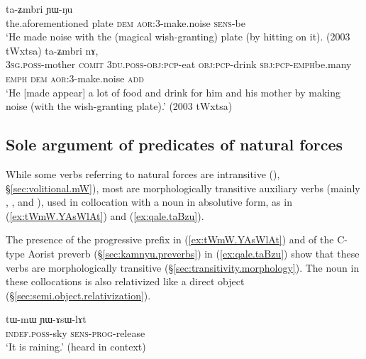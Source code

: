 \begin{exe}
\ex 
\begin{xlist}
\ex \label{ex:taZmbri}
  ta-ʑmbri ɲɯ-ŋu \\
 the.aforementioned plate \textsc{dem} \textsc{aor}:3\flobv{}-make.noise \textsc{sens}-be \\
\glt `He made noise with the (magical wish-granting) plate (by hitting on it). (2003 tWxtsa)
\ex \label{ex:taZmbri2}
  ta-ʑmbri nɤ, \\
 \textsc{3sg}.\textsc{poss}-mother \textsc{comit} \textsc{3du}.\textsc{poss}-\textsc{obj}:\textsc{pcp}-eat \textsc{obj}:\textsc{pcp}-drink \textsc{sbj}:\textsc{pcp}-\textsc{emph}\redp{}be.many \textsc{emph} \textsc{dem} \textsc{aor}:3\flobv{}-make.noise \textsc{add} \\
\glt `He [made appear] a lot of food and drink for him and his mother by making noise (with the wish-granting plate).' (2003 tWxtsa)
\end{xlist}
\end{exe}

\subsection{Sole argument of predicates of natural forces} \label{sec:absolutive.nature}
  
While some verbs referring to natural forces are intransitive (), §\ref{sec:volitional.mW}), most are morphologically transitive auxiliary verbs (mainly , ,  and ), used in collocation with a noun in absolutive form, as in (\ref{ex:tWmW.YAsWlAt}) and (\ref{ex:qale.taBzu}).

The presence of the progressive  prefix in (\ref{ex:tWmW.YAsWlAt}) and of the C-type Aorist  preverb (§\ref{sec:kamnyu.preverbs}) in (\ref{ex:qale.taBzu}) show that these verbs are morphologically transitive (§\ref{sec:transitivity.morphology}). The noun in these collocations is also relativized like a direct object (§\ref{sec:semi.object.relativization}).
 
\begin{exe}
\ex \label{ex:tWmW.YAsWlAt}
 \gll tɯ-mɯ ɲɯ-ɤsɯ-lɤt \\
 \textsc{indef}.\textsc{poss}-sky \textsc{sens}-\textsc{prog}-release \\
 \glt `It is raining.' (heard in context)
\end{exe}


